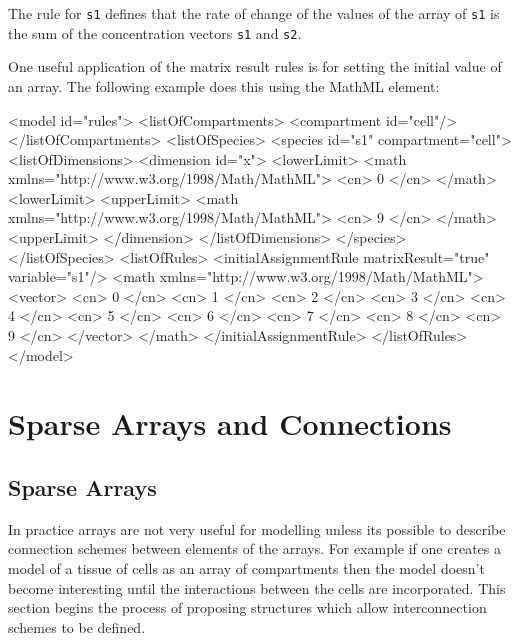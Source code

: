 \documentclass{cekarticle}
\begin{document}
The rule for \texttt{s1} defines that the rate of change of the
values of the array of \texttt{s1} is the sum of the concentration vectors
\texttt{s1} and \texttt{s2}.

One useful application of the matrix result rules is for setting the initial
value of an array.  The following example does this using the MathML  
element:

\begin{example}
<model id="rules">
    <listOfCompartments>
        <compartment id="cell"/>
    </listOfCompartments>
    <listOfSpecies>
        <species id="s1" compartment="cell">
            <listOfDimensions>
                <dimension id="x">
                    <lowerLimit>
                        <math xmlns="http://www.w3.org/1998/Math/MathML">
                            <cn> 0 </cn>
                        </math>
                    <lowerLimit>
                    <upperLimit>
                        <math xmlns="http://www.w3.org/1998/Math/MathML">
                            <cn> 9 </cn>
                        </math>
                    <upperLimit>
                </dimension>
            </listOfDimensions>
        </species>
    </listOfSpecies>
    <listOfRules>
        <initialAssignmentRule matrixResult="true" variable="s1"/>
            <math xmlns="http://www.w3.org/1998/Math/MathML">
                <vector>
                    <cn> 0 </cn>
                    <cn> 1 </cn>
                    <cn> 2 </cn>
                    <cn> 3 </cn>
                    <cn> 4 </cn>
                    <cn> 5 </cn>
                    <cn> 6 </cn>
                    <cn> 7 </cn>
                    <cn> 8 </cn>
                    <cn> 9 </cn>
                </vector>
            </math>
        </initialAssignmentRule>
    </listOfRules>
</model>
\end{example}

\section{Sparse Arrays and Connections}
\label{sec:sparseandconnections}

\subsection{Sparse Arrays}
\label{sec:sparse}

In practice arrays are not very useful for modelling unless its
possible to describe connection schemes between elements of the
arrays.  For example if one creates a model of a tissue of cells
as an array of compartments then the model doesn't become
interesting until the interactions between the cells are
incorporated.  This section begins the process of proposing
structures which allow interconnection schemes to be defined.
\end{document}
